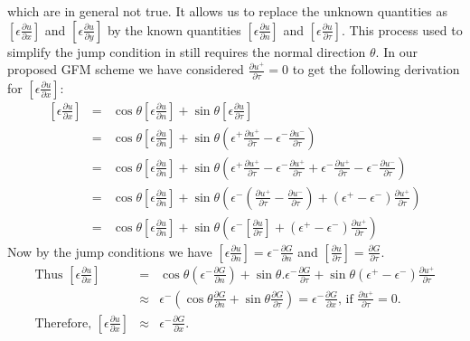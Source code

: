 which are in general not true.
It allows us to replace the unknown quantities as  $\left[\epsilon \frac{\partial u}{\partial x}\right]$ and $\left[\epsilon \frac{\partial u}{\partial y}\right]$ by the known quantities $\left[\epsilon \frac{\partial u}{\partial n}\right]$ and $\left[\epsilon \frac{\partial u}{\partial \tau}\right]$. This process used to simplify the jump condition in \cite{Liu2000} still requires the normal direction $\theta$. In our proposed GFM scheme  we have considered $\frac{\partial u^+}{\partial \tau}=0$ to get the following derivation for $ \left[\epsilon \frac{\partial u}{\partial x}\right] $:
\begin{eqnarray*}
\left[\epsilon \frac{\partial u}{\partial x}\right] &=& \cos \theta \left[\epsilon \frac{\partial u}{\partial n}\right] +\sin \theta \left[\epsilon \frac{\partial u}{\partial \tau}\right]\\
&=& \cos \theta \left[\epsilon \frac{\partial u}{\partial n}\right] +\sin \theta \left(\epsilon^+\frac{\partial u^+}{\partial \tau}-\epsilon^-\frac{\partial u^-}{\partial \tau}\right)\\
&=& \cos \theta\left[\epsilon \frac{\partial u}{\partial n}\right]+\sin \theta \left(\epsilon^+\frac{\partial u^+}{\partial \tau}-\epsilon^-\frac{\partial u^+}{\partial \tau}+\epsilon^-\frac{\partial u^+}{\partial \tau}-\epsilon^-\frac{\partial u^-}{\partial \tau}\right)\\
&=&\cos \theta\left[\epsilon \frac{\partial u}{\partial n}\right]+\sin \theta \left(\epsilon^-\left(\frac{\partial u^+}{\partial \tau}-\frac{\partial u^-}{\partial \tau}\right)+(\epsilon^+-\epsilon^-)\frac{\partial u^+}{\partial \tau}\right)\\
&=&\cos \theta\left[\epsilon \frac{\partial u}{\partial n}\right]+\sin \theta \left(\epsilon^-\left[\frac{\partial u}{\partial \tau}\right]+(\epsilon^+-\epsilon^-)\frac{\partial u^+}{\partial \tau}\right)
\end{eqnarray*}
Now by the jump conditions we have $ \left[\epsilon \frac{\partial u}{\partial n}\right] =\epsilon^- \frac{\partial G}{\partial n}$ and $\left[\frac{\partial u}{\partial \tau}\right]= \frac{\partial G}{\partial \tau}.$
\begin{eqnarray*}
\text{Thus } \left[\epsilon \frac{\partial u}{\partial x}\right] &=& \cos \theta (\epsilon^- \frac{\partial G}{\partial n})+\sin \theta .\epsilon^- \frac{\partial G}{\partial \tau} +\sin \theta (\epsilon^+ -\epsilon^- ) \frac{\partial u^+}{\partial \tau}\\
&\approx & \epsilon^-(\cos \theta  \frac{\partial G}{\partial n}+\sin \theta\frac{\partial G}{\partial \tau}) = \epsilon^- \frac{\partial G}{\partial x}\text{, if }\frac{\partial u^+}{\partial \tau}=0.\\
\text{Therefore, }\left[\epsilon \frac{\partial u}{\partial x}\right]&\approx &  \epsilon^- \frac{\partial G}{\partial x}.
\end{eqnarray*}

